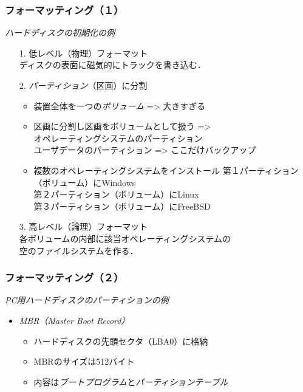 \documentclass{beamer}                   %
\begin{document}
\begin{frame}
  \frametitle{フォーマッティング（１）}
  \emph{ハードディスクの初期化の例}
  \begin{itemize}
    \item[1.] 低レベル（物理）フォーマット \\
      ディスクの表面に磁気的にトラックを書き込む．
    \item[2.] \emph{パーティション}（区画）に分割 \\
      \begin{itemize}
      \item 装置全体を一つの\emph{ボリューム} => 大きすぎる
      \item 区画に分割し区画をボリュームとして扱う => \\
        オペレーティングシステムのパーティション \\
        ユーザデータのパーティション => ここだけバックアップ
      \item 複数のオペレーティングシステムをインストール
        第１パーティション（ボリューム）にWindows \\
        第２パーティション（ボリューム）にLinux \\
        第３パーティション（ボリューム）にFreeBSD
      \end{itemize}
    \item[3.] 高レベル（論理）フォーマット \\
      各ボリュームの内部に該当オペレーティングシステムの \\
      空のファイルシステムを作る．
  \end{itemize}
\end{frame}

\begin{frame}
  \frametitle{フォーマッティング（２）}
  \emph{PC用ハードディスクのパーティションの例}
  \begin{itemize}
  \item \emph{MBR（Master Boot Record）} \\
    \begin{itemize}
    \item ハードディスクの先頭セクタ（LBA0）に格納
    \item MBRのサイズは512バイト
    \item 内容は\emph{ブートプログラム}と\emph{パーティションテーブル}
    \end{itemize}
  \end{itemize}
\end{frame}
\end{document}
